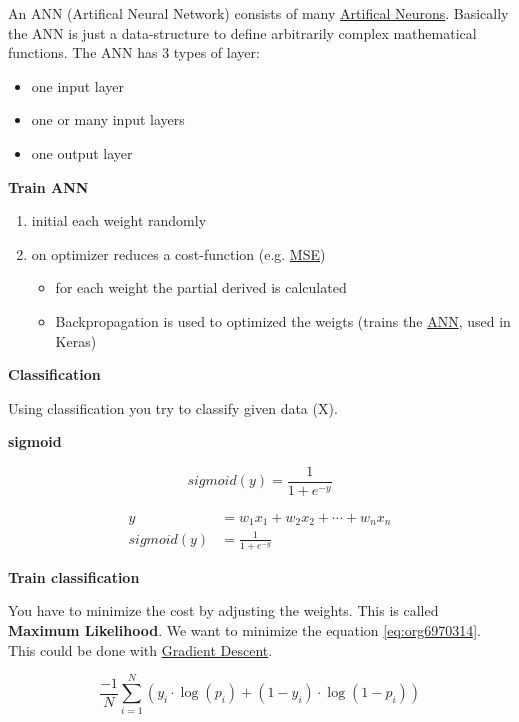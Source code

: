 \documentclass[11pt,twoside,landscape]{article}
\begin{document}
\begin{multicols}{3}
An ANN (Artifical Neural Network) consists of many \href{../../../roam/20211214121841-artifical_neurons.org}{Artifical Neurons}.
Basically the ANN is just a data-structure to define arbitrarily complex mathematical functions.
The ANN has 3 types of layer:
\begin{itemize}
\item one input layer
\item one or many input layers
\item one output layer
\end{itemize}


\textbf{Train ANN}

\begin{enumerate}
\item initial each weight randomly
\item on optimizer reduces a cost-function (e.g. \href{../../../roam/20211004175550-mean_squared_error.org}{MSE})
\begin{itemize}
\item for each weight the partial derived is calculated
\item Backpropagation is used to optimized the weigts (trains the \href{../../../roam/20211214110732-ann.org}{ANN}, used in Keras)
\end{itemize}
\end{enumerate}

\textbf{Classification}

Using classification you try to classify given data (X).

\textbf{sigmoid}

\begin{equation}
  sigmoid(y) = \frac{1}{1 + e^{-y}}
\end{equation}

\begin{align}
  y &= w_1x_1 + w_2x_2 + \cdots + w_nx_n \\
  sigmoid(y) &= \frac{1}{1 + e^{-y}}
\end{align}


\textbf{Train classification}

You have to minimize the cost by adjusting the weights.
This is called \textbf{Maximum Likelihood}.
We want to minimize the equation \ref{eq:org6970314}.
This could be done with \href{../../../roam/20211208163604-gradient_descent.org}{Gradient Descent}.

\begin{equation}
\label{eq:org6970314}
  \frac{-1}{N}\sum_{i=1}^{N}(y_i \cdot \log(p_i) + (1 - y_i)\cdot \log(1-p_i))
\end{equation}


\end{multicols}
\end{document}
